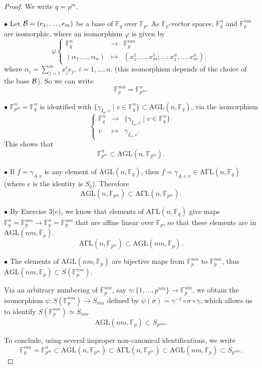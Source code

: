 \documentclass[11pt,a4paper]{article}
\newcommand{\F}{\mathbb{F}}
\begin{document}
  \begin{proof}
  We write $q = p^m$.
  \item[$\bullet$] 
  Let ${\cal B} = (e_1,\ldots,e_m)$ be a base of $\F_q$ over $\F_p$.
As $\F_p$-vector spaces, $\F_q^n$ and $\F_p^{nm}$ are isomorphic, where an isomorphism $\varphi$ is given by
$$
\varphi \left\{
\begin{array}{ccc}
\F_q^n & \to & \F_p^{nm}\\
(\alpha_1,\ldots,\alpha_n)& \mapsto &(x_1^1,\ldots,x_m^1;\ldots;x_1^n,\ldots,x_m^n),
\end{array}
\right.
$$
where $\alpha_i = \sum_{j=1}^m x_j^i e_j,\ i=1,\ldots,n.$ (this isomorphism depends of the choice of the base $\cal B$).
 So we can write $$\F_p^{mn} = \F_{p^m}^n.$$
   \item[$\bullet$]  $ \F_{p^m}^n = \F_q^n$ is identified with $\{\gamma_{I_n,v} \mid v \in  \F_q^n\} \subset \mathrm{AGL}(n,\F_q)$, via the isomorphism
     $$
  \left\{
  \begin{array}{ccc}
  \F_{q}^n & \to  &\{\gamma_{I_n,v} \mid v \in  \F_q^n\}\\
  v&\mapsto & \gamma_{I_n,v}.
  \end{array}
  \right.
  $$
  This shows that $$\F_{p^m}^n  \subset \mathrm{AGL}(n,\F_{p^m}).$$
  
  \item[$\bullet$] If $f = \gamma_{A,v}$ is any element of $\mathrm{AGL}(n,\F_{q})$, then $f = \gamma_{A,e,v} \in  \mathrm{A\Gamma L}(n,\F_{q})$ (where $e$ is the identity is $S_{q}$). Therefore
  $$\mathrm{AGL}(n,\F_{p^m}) \subset \mathrm{A\Gamma L}(n,\F_{p^m}).$$
  
    \item[$\bullet$] By Exercise 3(c), we know that elements of $\mathrm{A\Gamma L}(n,\F_{q})$ give maps $\F_q^n = \F_p^{nm} \to \F_q^n = \F_p^{nm}$ that are affine linear over $\F_p$, so that these elements are in $\mathrm{AGL}(nm,\F_p)$.
    $$\mathrm{A\Gamma L}(n,\F_{p^m}) \subset \mathrm{AGL}(nm,\F_p).$$
  
    \item[$\bullet$] The elements of $ \mathrm{AGL}(nm,\F_p)$ are bijective maps from $\F_p^{nm}$ to $\F_p^{nm}$, thus $ \mathrm{AGL}(nm,\F_p) \subset S(\F_p^{nm}).$ 
    
  Via an arbitrary numbering of $\F_p^{nm}$, say $\gamma : \{1,\ldots,p^{nm}\} \to \F_p^{nm}$, we obtain the isomorphism $\psi : S(\F_p^{nm}) \to S_{nm}$ defined by $\psi(\sigma) = \gamma^{-1} \circ \sigma \circ \gamma$,  which allows us to identify  $S(\F_p^{nm}) \simeq S_{nm}$. 
  $$\mathrm{AGL}(nm,\F_p)\subset S_{p^{nm}}.$$
  
  To conclude, using several improper non-canonical identifications, we write
    $$\F_p^{mn} = \F_{p^m}^n \subset \mathrm{AGL}(n,\F_{p^m}) \subset \mathrm{A\Gamma L}(n,\F_{p^m}) \subset \mathrm{AGL}(nm,\F_p)\subset S_{p^{nm}}.$$
  \end{proof}
  
\end{document}
